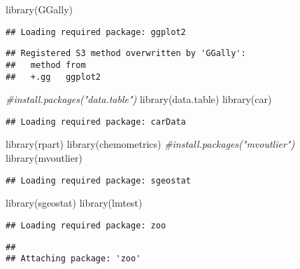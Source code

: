 \documentclass[
]{article}
\newenvironment{Shaded}{\begin{snugshade}}{\end{snugshade}}
\newcommand{\CommentTok}[1]{\textcolor[rgb]{0.56,0.35,0.01}{\textit{#1}}}
\newcommand{\FunctionTok}[1]{\textcolor[rgb]{0.00,0.00,0.00}{#1}}
\newcommand{\NormalTok}[1]{#1}
\begin{document}
\begin{Shaded}
\begin{Highlighting}[]
\FunctionTok{library}\NormalTok{(GGally)}
\end{Highlighting}
\end{Shaded}

\begin{verbatim}
## Loading required package: ggplot2
\end{verbatim}

\begin{verbatim}
## Registered S3 method overwritten by 'GGally':
##   method from   
##   +.gg   ggplot2
\end{verbatim}

\begin{Shaded}
\begin{Highlighting}[]
\CommentTok{\#install.packages("data.table")}
\FunctionTok{library}\NormalTok{(data.table)}
\FunctionTok{library}\NormalTok{(car)}
\end{Highlighting}
\end{Shaded}

\begin{verbatim}
## Loading required package: carData
\end{verbatim}

\begin{Shaded}
\begin{Highlighting}[]
\FunctionTok{library}\NormalTok{(rpart)}
\FunctionTok{library}\NormalTok{(chemometrics)}
\CommentTok{\#install.packages("mvoutlier")}
\FunctionTok{library}\NormalTok{(mvoutlier)}
\end{Highlighting}
\end{Shaded}

\begin{verbatim}
## Loading required package: sgeostat
\end{verbatim}

\begin{Shaded}
\begin{Highlighting}[]
\FunctionTok{library}\NormalTok{(sgeostat)}
\FunctionTok{library}\NormalTok{(lmtest)}
\end{Highlighting}
\end{Shaded}

\begin{verbatim}
## Loading required package: zoo
\end{verbatim}

\begin{verbatim}
## 
## Attaching package: 'zoo'
\end{verbatim}
\end{document}

